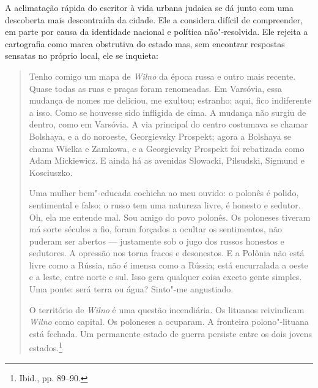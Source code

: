 A aclimatação rápida do escritor à vida urbana judaica se dá junto com
uma descoberta mais descontraída da cidade. Ele a considera difícil de
compreender, em parte por causa da identidade nacional e política
não"-resolvida. Ele rejeita a cartografia como marca obstrutiva do estado
mas, sem encontrar respostas sensatas no próprio local, ele se inquieta:

\begin{quote}
Tenho comigo um mapa de \textit{Wilno} da época russa e outro mais recente. Quase
todas as ruas e praças foram renomeadas. Em Varsóvia, essa mudança de
nomes me deliciou, me exultou; estranho: aqui, fico indiferente a isso.
Como se houvesse sido infligida de cima. A mudança não surgiu de dentro,
como em Varsóvia. A via principal do centro costumava se chamar
Bolshaya, e a do noroeste, Georgievsky Prospekt; agora a Bolshaya se
chama Wielka e Zamkowa, e a Georgievsky Prospekt foi rebatizada como
Adam Mickiewicz. E ainda há as avenidas Slowacki, Pilsudski, Sigmund e
Kosciuszko.

Uma mulher bem"-educada cochicha ao meu ouvido: o polonês é polido,
sentimental e falso; o russo tem uma natureza livre, é honesto e
sedutor. Oh, ela me entende mal. Sou amigo do povo polonês. Os poloneses
tiveram má sorte séculos a fio, foram forçados a ocultar os sentimentos,
não puderam ser abertos --- justamente sob o jugo dos russos honestos e
sedutores. A opressão nos torna fracos e desonestos. E a Polônia não
está livre como a Rússia, não é imensa como a Rússia; está encurralada a
oeste e a leste, entre norte e sul. Isso gera qualquer coisa exceto
gente simples. Uma ponte: será terra ou água? Sinto"-me angustiado.

O território de \textit{Wilno} é uma questão incendiária. Os lituanos reivindicam
\textit{Wilno} como capital. Os poloneses a ocuparam. A fronteira polono"-lituana
está fechada. Um permanente estado de guerra persiste entre os dois
jovens estados.\footnote{Ibid., pp. 89--90.}
\end{quote}


